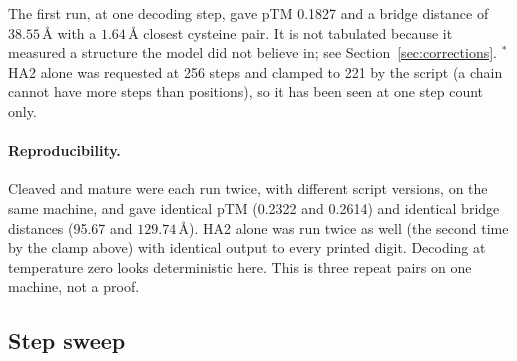 \documentclass[11pt,a4paper]{article}
\newcommand{\ang}{\,\mbox{\AA}}
\begin{document}
\noindent The first run, at one decoding step, gave pTM 0.1827 and a bridge
distance of $38.55\ang$ with a $1.64\ang$ closest cysteine pair. It is not
tabulated because it measured a structure the model did not believe in;
see Section~\ref{sec:corrections}. $^{*}$HA2 alone was requested at 256 steps
and clamped to 221 by the script (a chain cannot have more steps than
positions), so it has been seen at one step count only.

\paragraph{Reproducibility.} Cleaved and mature were each run twice, with
different script versions, on the same machine, and gave identical pTM
(0.2322 and 0.2614) and identical bridge distances (95.67 and $129.74\ang$).
HA2 alone was run twice as well (the second time by the clamp above) with
identical output to every printed digit. Decoding at temperature zero looks
deterministic here. This is three repeat pairs on one machine, not a proof.

\subsection{Step sweep}
\end{document}
